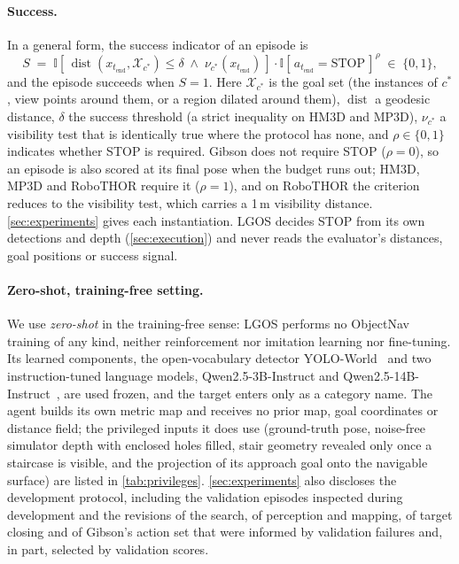 \documentclass[10pt]{article}
\newcommand{\ours}{LGOS\xspace}
\newcommand{\cstar}{c^{*}}
\begin{document}
\paragraph{Success.}
In a general form, the success indicator of an episode is
\begin{equation}
  S \;=\; \mathbb{I}\left[\, \operatorname{dist}\left(x_{t_{\mathrm{end}}}, \mathcal{X}_{\cstar}\right) \le \delta
  \;\wedge\; \nu_{\cstar}\left(x_{t_{\mathrm{end}}}\right) \,\right] \cdot
  \mathbb{I}\left[\, a_{t_{\mathrm{end}}} = \text{STOP} \,\right]^{\rho} \;\in\; \{0, 1\},
  \label{eq:success}
\end{equation}
and the episode succeeds when $S = 1$. Here $\mathcal{X}_{\cstar}$ is the goal set (the instances of $\cstar$, view
points around them, or a region dilated around them), $\operatorname{dist}$ a geodesic distance, $\delta$ the success
threshold (a strict inequality on HM3D and MP3D), $\nu_{\cstar}$ a visibility test that is identically true where the
protocol has none, and $\rho \in \{0, 1\}$ indicates whether STOP is required. Gibson does not require
STOP ($\rho = 0$), so an episode is also scored at its final pose when the budget runs out; HM3D, MP3D and
RoboTHOR require it ($\rho = 1$), and on RoboTHOR the criterion reduces to the visibility test, which carries a 1\,m
visibility distance. \cref{sec:experiments} gives each instantiation. \ours decides STOP from its own
detections and depth (\cref{sec:execution}) and never reads the evaluator's distances, goal positions or success
signal.

\paragraph{Zero-shot, training-free setting.}
We use \emph{zero-shot} in the training-free sense: \ours performs no ObjectNav training of any kind, neither
reinforcement nor imitation learning nor fine-tuning. Its learned components, the open-vocabulary detector
YOLO-World~\citep{cheng2024yolo} and two instruction-tuned language models, Qwen2.5-3B-Instruct and
Qwen2.5-14B-Instruct~\citep{yang2024qwen25}, are used frozen, and the target enters only as a category name. The agent
builds its own metric map and receives no prior map, goal coordinates or distance field; the privileged inputs it does
use (ground-truth pose, noise-free simulator depth with enclosed holes filled, stair geometry revealed only once a
staircase is visible, and the projection of its approach goal onto the navigable surface) are listed in
\cref{tab:privileges}. \cref{sec:experiments} also discloses the development protocol, including the validation episodes inspected
during development and the revisions of the search, of perception and mapping, of target closing and of Gibson's
action set that were informed by validation failures and, in part, selected by validation scores.
\end{document}
